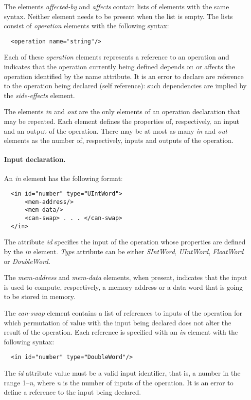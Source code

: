 \documentclass[twoside]{tce}
\begin{document}
The elements \emph{affected-by} and \emph{affects} contain lists of elements
with the same syntax.  Neither element needs to be present when the list is
empty.  The lists consist of \emph{operation} elements with the following
syntax:
\begin{verbatim}
  <operation name="string"/>
\end{verbatim}
%
Each of these \emph{operation} elements represents a reference to an
operation and indicates that the operation currently being defined depends
on or affects the operation identified by the name attribute.
%
It is an error to declare are reference to the operation being declared
(self reference): such dependencies are implied by the \emph{side-effects}
element.

The elements \emph{in} and \emph{out} are the only elements of an operation
declaration that may be repeated.  Each element defines the properties of,
respectively, an input and an output of the operation.  There may be at most
as many \emph{in} and \emph{out} elements as the number of, respectively,
inputs and outputs of the operation.

\paragraph{Input declaration.}
An \emph{in} element has the following format:
\begin{verbatim}
  <in id="number" type="UIntWord">
      <mem-address/>
      <mem-data/>
      <can-swap> . . . </can-swap>
  </in>
\end{verbatim}

The attribute \emph{id} specifies the input of the operation whose
properties are defined by the \emph{in} element. \emph{Type} attribute can
be either \emph{SIntWord}, \emph{UIntWord}, \emph{FloatWord} or \emph{DoubleWord}.

The \emph{mem-address} and \emph{mem-data} elements, when present, indicates
that the input is used to compute, respectively, a memory address or a data
word that is going to be stored in memory.

The \emph{can-swap} element contains a list of references to inputs of the
operation for which permutation of value with the input being declared does
not alter the result of the operation.  Each reference is specified with an
\emph{in} element with the following syntax:
\begin{verbatim}
  <in id="number" type="DoubleWord"/>
\end{verbatim}
%
The \emph{id} attribute value must be a valid input identifier, that is, a
number in the range 1--\emph{n}, where \emph{n} is the number of inputs of
the operation.
%
It is an error to define a reference to the input being declared.
\end{document}
